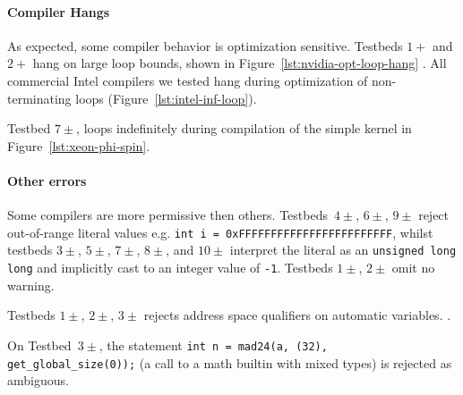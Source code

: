 \paragraph{Compiler Hangs} %
As expected, some compiler behavior is optimization sensitive. Testbeds $1+$ and $2+$ hang on large loop bounds, shown in Figure~\ref{lst:nvidia-opt-loop-hang} . All commercial Intel compilers we tested hang during optimization of non-terminating loops (Figure~\ref{lst:intel-inf-loop}).

Testbed $7\pm$, loops indefinitely during compilation of the simple kernel in Figure~\ref{lst:xeon-phi-spin}.

\paragraph{Other errors} %

Some compilers are more permissive then others. Testbeds~$4\pm$, $6\pm$, $9\pm$ reject out-of-range literal values e.g. \texttt{int i = 0xFFFFFFFFFFFFFFFFFFFFFFFF}, whilst testbeds $3\pm$, $5\pm$, $7\pm$, $8\pm$, and $10\pm$ interpret the literal as an \texttt{unsigned long long} and implicitly cast to an integer value of \texttt{-1}. Testbeds $1\pm$, $2\pm$ omit no warning.

Testbeds $1\pm$, $2\pm$, $3\pm$ rejects address space qualifiers on automatic variables. .

On Testbed~$3\pm$, the statement \texttt{int n = mad24(a, (32), get\_global\_size(0));} (a call to a math builtin with mixed types) is rejected as ambiguous.


%
%


